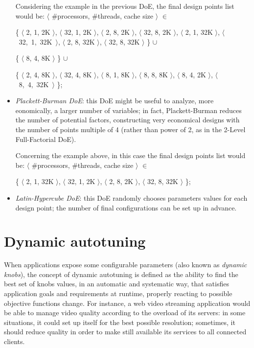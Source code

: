 \begin{itemize}
\begin{enumerate}
    \end{enumerate}
    
    Considering the example in the previous DoE, the final design points list would be: $\langle$ \#processors, \#threads, cache size $\rangle$ $\in$
    
    \{ $\langle$ 2, 1, 2K $\rangle$, $\langle$ 32, 1, 2K $\rangle$, $\langle$ 2, 8, 2K $\rangle$, $\langle$ 32, 8, 2K $\rangle$, $\langle$ 2, 1, 32K $\rangle$, \hbox{$\langle$ 32, 1, 32K $\rangle$}, $\langle$ 2, 8, 32K $\rangle$, $\langle$ 32, 8, 32K $\rangle$ \} $\cup$ 
    
    \{ $\langle$ 8, 4, 8K $\rangle$ \} $\cup$
    
    \{ $\langle$ 2, 4, 8K $\rangle$, $\langle$ 32, 4, 8K $\rangle$, $\langle$ 8, 1, 8K $\rangle$, $\langle$ 8, 8, 8K $\rangle$, $\langle$ 8, 4, 2K $\rangle$, \hbox{$\langle$ 8, 4, 32K $\rangle$} \};
    
    \item \textit{Plackett-Burman DoE}: this DoE might be useful to analyze, more eonomically, a larger number of variables; in fact, Plackett-Burman reduces the number of potential factors, constructing very economical designs with the number of points multiple of 4 (rather than power of 2, as in the 2-Level Full-Factorial DoE).
    
    Concerning the example above, in this case the final design points list would be: $\langle$ \#processors, \#threads, cache size $\rangle$ $\in$
    
    \{ $\langle$ 2, 1, 32K $\rangle$, $\langle$ 32, 1, 2K $\rangle$, $\langle$ 2, 8, 2K $\rangle$, $\langle$ 32, 8, 32K $\rangle$ \};
    
    \item \textit{Latin-Hypercube DoE}: this DoE randomly chooses parameters values for each design point; the number of final configurations can be set up in advance.

\end{itemize}





\section{Dynamic autotuning}

When applications expose some configurable parameters (also known as \textit{dynamic knobs}), the concept of dynamic autotuning is defined as the ability to find the best set of knobs values, in an automatic and systematic way, that satisfies application goals and requirements at runtime, properly reacting to possible objective functions change. For instance, a web video streaming application would be able to manage video quality according to the overload of its servers: in some situations, it could set up itself for the best possible resolution; sometimes, it should reduce quality in order to make still available its services to all connected clients.

